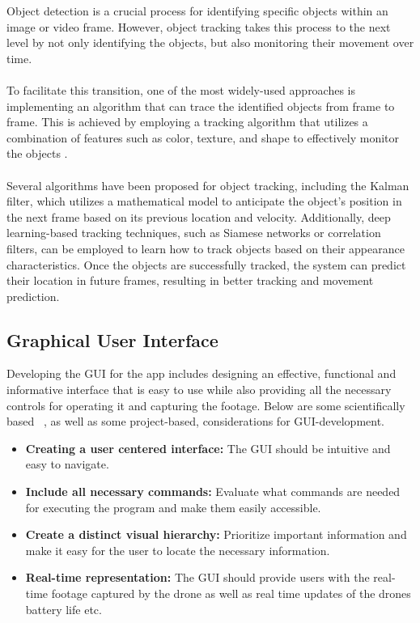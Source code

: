 Object detection is a crucial process for identifying specific objects within an image or video frame. However, object tracking takes this process to the next level by not only identifying the objects, but also monitoring their movement over time.
\\ \\
To facilitate this transition, one of the most widely-used approaches is implementing an algorithm that can trace the identified objects from frame to frame. This is achieved by employing a tracking algorithm that utilizes a combination of features such as color, texture, and shape to effectively monitor the objects .
\\ \\
Several algorithms have been proposed for object tracking, including the Kalman filter, which utilizes a mathematical model to anticipate the object's position in the next frame based on its previous location and velocity. Additionally, deep learning-based tracking techniques, such as Siamese networks or correlation filters, can be employed to learn how to track objects based on their appearance characteristics. Once the objects are successfully tracked, the system can predict their location in future frames, resulting in better tracking and movement prediction.

\subsection{Graphical User Interface} \label{GUI}
Developing the GUI for the app includes designing an effective, functional and informative interface that is easy to use while also providing all the necessary controls for operating it and capturing the footage. Below are some scientifically based ~\cite{AntchevaGUIDELINESGUI}, as well as some project-based, considerations for GUI-development. 
\\

\begin{itemize}
    \item \textbf{Creating a user centered interface:} The GUI should be intuitive and easy to navigate. 
    \item \textbf{Include all necessary commands:} Evaluate what commands are needed for executing the program and make them easily accessible. 
    \item \textbf{Create a distinct visual hierarchy:} Prioritize important information and make it easy for the user to locate the necessary information. 
    \item \textbf{Real-time representation:} The GUI should provide users with the real-time footage captured by the drone as well as real time updates of the drones battery life etc. 
    
\end{itemize}


